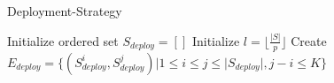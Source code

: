 


\begin{algorithm}[!h]
\small
\caption{Deployment-Strategy}
\label{alg:deployment-strategy}
 Initialize ordered set $S_{deploy}=[]$\;
 Initialize $l=\lfloor \frac{|S|}{p}\rfloor$\;
{
}
 Create $E_{deploy}=\{(S_{deploy}^i,S_{deploy}^j)|1\leq i\le j\leq |S_{deploy}|, j-i\leq K \}$\;
\end{algorithm}




